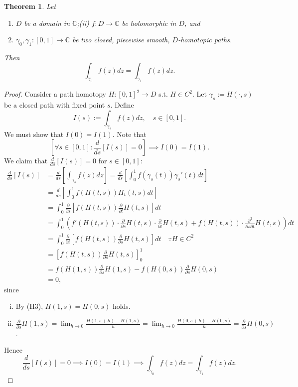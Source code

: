 \documentclass[12pt,openany]{book}
\newtheorem{theorem}{Theorem}[chapter]
\theoremstyle{definition}
\newcommand{\C}{\mathbb{C}}
\newcommand{\of}[1]{\left( #1 \right)}
\begin{document}
	\newpage
	\begin{tcolorbox}[colback=white,colframe=thmcolor,arc=5pt,title={\color{white}\bf The Cauchy Integral Theorem}]
		\begin{theorem}
			Let \begin{enumerate}
				\item[(i)] $D$ be a domain in $\C$;\quad (ii) $f:D\to\C$ be holomorphic in $D$, and
				\item[(iii)] $\gamma_0,\gamma_1:[0,1]\to\C$ be two closed, piecewise smooth, $D$-homotopic paths.
			\end{enumerate} Then \[
			\int_{\gamma_0}f\of{z}dz=\int_{\gamma_1}f\of{z}dz.
			\]
		\end{theorem}
	\end{tcolorbox}
	\begin{proof}
		Consider a path homotopy $H:[0,1]^2\to D$ s.t. $H\in C^2$. Let $\gamma_s:=H\of{\cdot, s}$ be a closed path with fixed point $s$. Define \[
		I\of{s}:=\int_{\gamma_s}f\of{z}dz,\quad s\in[0,1].
		\] We must show that $I(0)=I(1)$. Note that \[
		\left[\forall s\in[0,1]:\frac{d}{ds}\left[I(s)\right]=0\right]\implies I(0)=I(1).
		\] We claim that $\displaystyle\frac{d}{ds}\left[I(s)\right]=0$ for $s\in[0,1]$:
		\begin{align*}
			\frac{d}{ds}\left[I(s)\right]&=\frac{d}{ds}\left[\int_{\gamma_s}f\of{z}dz\right]=\frac{d}{ds}\left[\int_0^1f\of{\gamma_s\of{t}}\gamma_s'\of{t}dt\right]\\
			&=\frac{d}{ds}\left[\int_0^1f\of{H\of{t,s}}H_t\of{t,s}dt\right]\\
			&=\int_0^1\frac{\partial}{\partial s}\left[f\of{H\of{t,s}}\frac{\partial}{\partial t}H\of{t,s}\right]dt\\
			&=\int_0^1\left(f'\of{H(t,s)}\cdot \frac{\partial}{\partial s}H\of{t,s}\cdot \frac{\partial}{\partial t}H\of{t,s}+f\of{H(t,s)}\cdot \frac{\partial^2}{\partial s\partial t}H\of{t,s}\right)dt\\
			&=\int_0^1\frac{\partial}{\partial t}\left[f\of{H(t,s)}\frac{\partial }{\partial s}H\of{t,s}\right]dt\quad\because H\in C^2\\
			&=\left[f\of{H(t,s)}\frac{\partial }{\partial s}H\of{t,s}\right]_0^1\\
			&=f\of{H\of{1,s}}\frac{\partial}{\partial s}H\of{1,s}-f\of{H\of{0,s}}\frac{\partial}{\partial s}H\of{0,s}\\
			&=0,
		\end{align*} since \begin{enumerate}[(i)]
			\item By (H3), $H\of{1,s}=H\of{0,s}$ holds.
			\item $\displaystyle\frac{\partial}{\partial s}H\of{1,s}=\lim_{h\to 0}\frac{H\of{1,s+h}-H\of{1,s}}{h}=\lim_{h\to 0}\frac{H\of{0,s+h}-H\of{0,s}}{h}=\frac{\partial}{\partial s}H\of{0,s}$.
		\end{enumerate}
		Hence \[
		\frac{d}{ds}\left[I\of{s}\right]=0\implies I\of{0}=I\of{1}\implies
		\int_{\gamma_0}f\of{z}dz=\int_{\gamma_1}f\of{z}dz.
		\]
	\end{proof}
\end{document}
